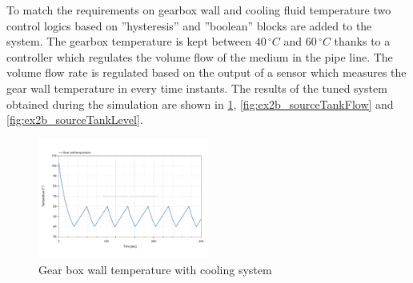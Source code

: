 \documentclass[11pt,a4paper,oneside]{article}
\begin{document}
To match the requirements on gearbox wall and cooling fluid temperature two control logics based on ''hysteresis'' and ''boolean'' blocks are added to the system.
The gearbox temperature is kept between $40\,^{\circ}C$ and $60\,^{\circ}C$ thanks to a controller which regulates the volume flow of the medium in the pipe line.
The volume flow rate is regulated based on the output of a sensor which measures the gear wall temperature in every time instants.
The results of the tuned system obtained during the simulation are shown in \cref{fig:ex2b_gearWallTemp}, \cref{fig:ex2b_sourceTankFlow} and \cref{fig:ex2b_sourceTankLevel}.
\begin{figure}[H]
    \centering
    \includegraphics*[width=0.5\textwidth, keepaspectratio]{Figures/ex2b_gearWallTemp.pdf}
    \caption[]{\label{fig:ex2b_gearWallTemp} Gear box wall temperature with cooling system}
\end{figure}
\end{document}

